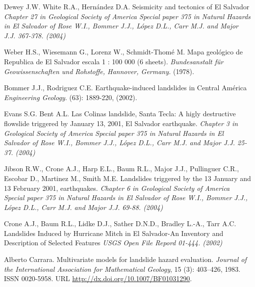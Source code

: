 \documentclass[11pt,twoside]{rmta2010esp}%
\begin{document}
\begin{thebibliography}{99}




Dewey J.W. White R.A., Hern\'{a}ndez D.A.
\newblock Seismicity and tectonics of El Salvador
\newblock \emph{Chapter 27 in Geological Society of America Special paper 375 in Natural Hazards in El Salvador of Rose W.I., Bommer J.J., L\'{o}pez D.L., Carr M.J. and Major J.J. 367-378. (2004)}


Weber H.S., Wiesemann G., Lorenz  W., Schmidt-Thom\'{e} M.
\newblock Mapa geol\'{o}gico de Republica de El Salvador
\newblock escala 1 : 100 000 (6 sheets).
\newblock \emph{ Bundesanstalt f\"ur Geowissenschaften und Rohstoffe, Hannover, Germany.
}
 (1978).


Bommer J.J., Rodriguez C.E.
\newblock Earthquake-induced landslides in Central Am\'{e}rica
\newblock \emph{Engineering Geology}.
(63): 1889-220, (2002).


Evans S.G. Bent A.L.
\newblock Las Colinas landslide, Santa Tecla:  A higly destructive flowslide triggered by January 13, 2001, El Salvador earthquake.
\newblock \emph{Chapter 3 in Geological Society of America Special paper 375 in Natural Hazards in El Salvador of Rose W.I., Bommer J.J., L\'{o}pez D.L., Carr M.J. and Major J.J. 25-37. (2004)}



Jibson R.W., Crone A.J., Harp E.L., Baum R.L., Major J.J., Pullinguer C.R., Escobar D., Martinez M., Smith M.E. 
\newblock Landslides triggered by the 13 January and 13 February 2001, earthquakes.
\newblock \emph{ Chapter 6 in Geological Society of America Special paper 375 in Natural Hazards in El Salvador of Rose W.I., Bommer J.J., L\'{o}pez D.L., Carr M.J. and Major J.J. 69-88. (2004)}



Crone A.J., Baum R.L., Lidke D.J., Sather D.N.D., Bradley L.-A., Tarr A.C.
\newblock Landslides Induced by Hurricane Mitch in El Salvador-An Inventory and Description of Selected Features
\newblock \emph{USGS Open File Repord 01-444. (2002)}



Alberto Carrara.
\newblock Multivariate models for landslide hazard evaluation.
\newblock \emph{Journal of the International Association for Mathematical
  Geology}, 15 (3): 403--426, 1983.
\newblock ISSN 0020-5958.
\newblock URL \url{http://dx.doi.org/10.1007/BF01031290}.



\end{thebibliography}
\end{document}
